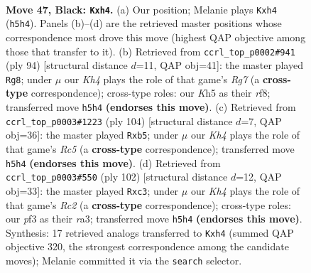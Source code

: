 \documentclass[11pt]{article}
\begin{document}
\clearpage

\begin{figure}[p]\centering
\begin{subfigure}{0.46\textwidth}\centering
\resizebox{\linewidth}{!}{%
\newchessgame
\chessboard[
  setfen={8/p2p4/2p5/4K2k/7P/3r1P2/8/8 b - - 0 47},
  showmover=false,
  pgfstyle=straightmove, color=movearrow, markmove={h5-h4}
]}
\caption{}
\end{subfigure}\hfill
\begin{subfigure}{0.46\textwidth}\centering
\resizebox{\linewidth}{!}{%
\newchessgame
\chessboard[
  setfen={5r2/5PR1/6p1/1k4K1/8/p7/7P/8 w - - 0 48},
  showmover=false,
  pgfstyle=straightmove, color=movearrow, markmove={g7-g8}
]}
\caption{}
\end{subfigure}
\\[4pt]
\begin{subfigure}{0.46\textwidth}\centering
\resizebox{\linewidth}{!}{%
\newchessgame
\chessboard[
  setfen={8/8/6k1/1pR5/6Kp/2P1r3/1P6/8 w - - 4 53},
  showmover=false,
  pgfstyle=straightmove, color=movearrow, markmove={c5-b5}
]}
\caption{}
\end{subfigure}\hfill
\begin{subfigure}{0.46\textwidth}\centering
\resizebox{\linewidth}{!}{%
\newchessgame
\chessboard[
  setfen={8/4k2p/8/8/3K4/r1p4P/2R3P1/8 w - - 2 52},
  showmover=false,
  pgfstyle=straightmove, color=movearrow, markmove={c2-c3}
]}
\caption{}
\end{subfigure}
\caption{\textbf{Move 47, Black: \texttt{Kxh4}.} (a) Our position; Melanie plays \texttt{Kxh4} (\texttt{h5h4}). Panels (b)--(d) are the retrieved master positions whose correspondence most drove this move (highest QAP objective among those that transfer to it). (b) Retrieved from \texttt{ccrl\_top\_p0002\#941} (ply 94) [structural distance $d$=11, QAP obj=41]: the master played \texttt{Rg8}; under $\mu$ our \emph{Kh4} plays the role of that game's \emph{Rg7} (a \textbf{cross-type} correspondence); cross-type roles: our \emph{K}h5 as their \emph{r}f8; transferred move \texttt{h5h4} \textbf{(endorses this move)}. (c) Retrieved from \texttt{ccrl\_top\_p0003\#1223} (ply 104) [structural distance $d$=7, QAP obj=36]: the master played \texttt{Rxb5}; under $\mu$ our \emph{Kh4} plays the role of that game's \emph{Rc5} (a \textbf{cross-type} correspondence); transferred move \texttt{h5h4} \textbf{(endorses this move)}. (d) Retrieved from \texttt{ccrl\_top\_p0003\#550} (ply 102) [structural distance $d$=12, QAP obj=33]: the master played \texttt{Rxc3}; under $\mu$ our \emph{Kh4} plays the role of that game's \emph{Rc2} (a \textbf{cross-type} correspondence); cross-type roles: our \emph{p}f3 as their \emph{r}a3; transferred move \texttt{h5h4} \textbf{(endorses this move)}. Synthesis: 17 retrieved analogs transferred to \texttt{Kxh4} (summed QAP objective 320, the strongest correspondence among the candidate moves); Melanie committed it via the \texttt{search} selector.}
\label{fig:thought-m93}
\end{figure}
\end{document}
